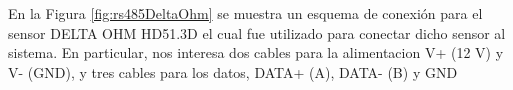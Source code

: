


En la Figura \ref{fig:rs485DeltaOhm} se muestra un esquema de conexión para el sensor DELTA OHM HD51.3D el cual fue utilizado para conectar dicho sensor al sistema. En particular, nos interesa dos cables para la alimentacion V+ (12 \unit{\volt}) y V- (GND), y tres cables para los datos, DATA+ (A), DATA- (B) y GND

